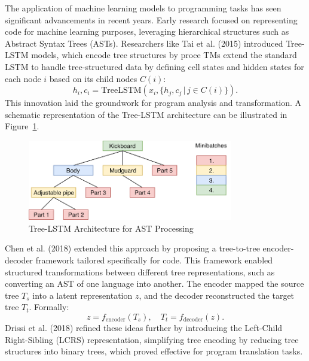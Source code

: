 \documentclass{dhbenelux}
\begin{document}
The application of machine learning models to programming tasks has seen significant advancements in recent years. Early research focused on representing code for machine learning purposes, leveraging hierarchical structures such as Abstract Syntax Trees (ASTs). Researchers like Tai et al. (2015) introduced Tree-LSTM models, which encode tree structures by proce
TMs extend the standard LSTM to handle tree-structured data by defining cell states and hidden states for each node \( i \) based on its child nodes \( C(i) \):
\begin{equation}
h_i, c_i = \text{TreeLSTM}(x_i, \{h_{j}, c_{j} \,|\, j \in C(i)\}).
\end{equation}
This innovation laid the groundwork for program analysis and transformation. A schematic representation of the Tree-LSTM architecture can be illustrated in Figure~\ref{fig:tree-lstm}.

\begin{figure}[h]
    \centering
    \includegraphics[width=0.8\textwidth]{Images/1.png} %
    \caption{Tree-LSTM Architecture for AST Processing}
    \label{fig:tree-lstm}
\end{figure}

Chen et al. (2018) extended this approach by proposing a tree-to-tree encoder-decoder framework tailored specifically for code. This framework enabled structured transformations between different tree representations, such as converting an AST of one language into another. The encoder mapped the source tree \( T_s \) into a latent representation \( z \), and the decoder reconstructed the target tree \( T_t \). Formally:
\begin{equation}
z = f_{\text{encoder}}(T_s), \quad T_t = f_{\text{decoder}}(z).
\end{equation}
Drissi et al. (2018) refined these ideas further by introducing the Left-Child Right-Sibling (LCRS) representation, simplifying tree encoding by reducing tree structures into binary trees, which proved effective for program translation tasks.
\end{document}
